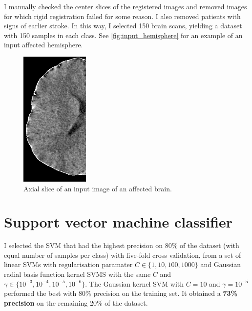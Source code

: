 \documentclass[twocolumn, openany, oneside, article]{memoir}
\begin{document}
I manually checked the center slices of the registered images and removed images
for which rigid registration failed for some reason. I also removed patients
with signs of earlier stroke. In this way, I selected 150 brain scans, yielding
a dataset with 150 samples in each class. See \autoref{fig:input_hemisphere} for
an example of an input affected hemisphere.

\begin{figure}
  \includegraphics[width=0.6\linewidth]{hemisphere_slice}
  \caption{Axial slice of an input image of an affected brain.}
  \label{fig:input_hemisphere}
\end{figure}

\section{Support vector machine classifier}

I selected the SVM that had the highest precision on 80\% of the dataset (with
equal number of samples per class) with five-fold cross validation, from a set of linear SVMs with
regularisation paramater $C \in \{1, 10, 100, 1000\}$ and Gaussian radial basis function kernel SVMS with
the same $C$ and $\gamma \in \{ 10^{-3}, 10^{-4}, 10^{-5}, 10^{-6} \}$. The Gaussian kernel SVM with $C = 10$ and $\gamma = 10^{-5}$
performed the best with 80\% precision on the training set. It obtained a \textbf{73\% precision} on the remaining 20\% of the dataset.
\end{document}
